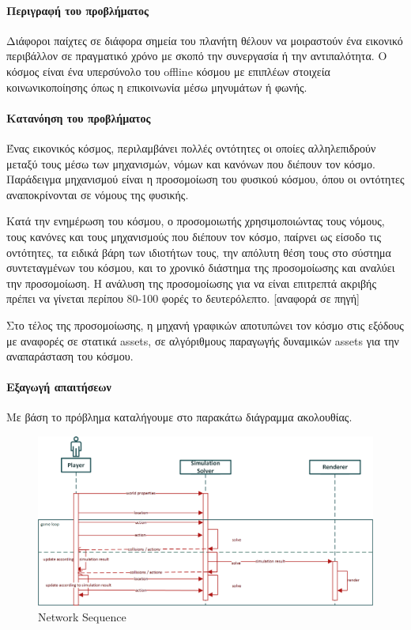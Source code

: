 \documentclass[oneside, 12pt]{book}
\begin{document}
		\paragraph{Περιγραφή του προβλήματος}
		Διάφοροι παίχτες σε διάφορα σημεία του πλανήτη θέλουν να μοιραστούν ένα εικονικό περιβάλλον σε πραγματικό χρόνο με σκοπό την συνεργασία ή την αντιπαλότητα. O κόσμος είναι ένα υπερσύνολο του offline κόσμου με επιπλέων στοιχεία κοινωνικοποίησης όπως η επικοινωνία μέσω μηνυμάτων ή φωνής.
		
		\paragraph{Κατανόηση του προβλήματος}
		
		Ένας εικονικός κόσμος, περιλαμβάνει πολλές οντότητες οι  οποίες αλληλεπιδρούν μεταξύ τους μέσω των μηχανισμών, νόμων και κανόνων που διέπουν τον κόσμο. Παράδειγμα μηχανισμού είναι η προσομοίωση του φυσικού κόσμου, όπου οι οντότητες αναποκρίνονται σε νόμους της φυσικής.
		
	    Κατά την ενημέρωση του κόσμου, ο προσομοιωτής χρησιμοποιώντας  τους νόμους, τους κανόνες και τους μηχανισμούς που διέπουν τον κόσμο, παίρνει ως είσοδο τις οντότητες, τα ειδικά βάρη των ιδιοτήτων τους, την απόλυτη θέση τους στο σύστημα συντεταγμένων του κόσμου, και το χρονικό διάστημα της προσομοίωσης και αναλύει την προσομοίωση. Η ανάλυση της προσομοίωσης για να είναι επιτρεπτά ακριβής πρέπει να γίνεται περίπου 80-100 φορές το δευτερόλεπτο. [αναφορά σε πηγή]
		
		Στο τέλος της προσομοίωσης, η μηχανή γραφικών αποτυπώνει τον κόσμο στις εξόδους με αναφορές σε στατικά assets, σε αλγόριθμους παραγωγής δυναμικών assets για την αναπαράσταση του κόσμου.
	
		\paragraph{Εξαγωγή απαιτήσεων}	
		Με βάση το πρόβλημα καταλήγουμε στο παρακάτω διάγραμμα ακολουθίας.
		
		\begin{figure}[h]
			\centering
			\includegraphics[width=140mm]{Images/gameloop_network_sequence}
			\caption{Network Sequence}
			\label{fig:Network Sequence}
		\end{figure}		
		
\end{document}
